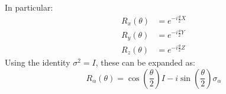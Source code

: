 \highspace
In particular:
\begin{align}
    R_x(\theta) &= e^{-i \frac{\theta}{2} X} \\
    R_y(\theta) &= e^{-i \frac{\theta}{2} Y} \\
    R_z(\theta) &= e^{-i \frac{\theta}{2} Z}
\end{align}
Using the identity $\sigma^2 = I$, these can be expanded as:
\begin{equation}\label{eq:rotation-operator-general-expanded}
    R_{\alpha}(\theta)
    =
    \cos\left(\frac{\theta}{2}\right) I
    -
    i \sin\left(\frac{\theta}{2}\right) \sigma_{\alpha}
\end{equation}